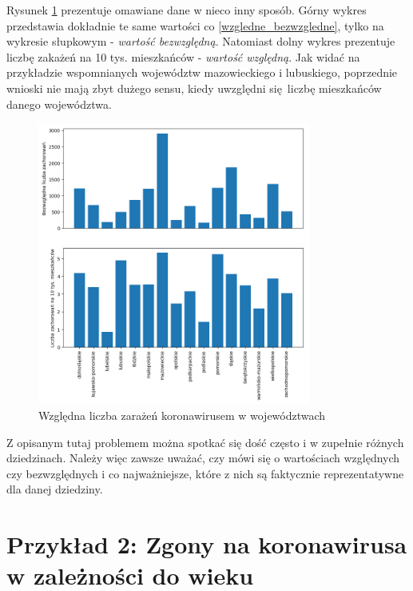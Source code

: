 \documentclass{classrep}
\begin{document}
Rysunek \ref{wzgledne_bezwzgledne_fixed} prezentuje omawiane dane w nieco inny sposób. Górny wykres
przedstawia dokładnie te same wartości co \ref{wzgledne_bezwzgledne}, tylko na wykresie słupkowym -
\emph{wartość bezwzględną}.  Natomiast dolny wykres prezentuje liczbę zakażeń na 10 tys.
mieszkańców - \emph{wartość względną}. Jak widać na przykładzie wspomnianych województw
mazowieckiego i lubuskiego, poprzednie wnioski nie mają zbyt dużego sensu, kiedy uwzględni
się liczbę mieszkańców danego województwa.

\begin{figure}
    \centering
    \includegraphics[width=0.8\textwidth,keepaspectratio]{img/wzgledne_bezwzgledne_fixed.png}
    \caption{Względna liczba zarażeń koronawirusem w województwach}
    \label{wzgledne_bezwzgledne_fixed}
\end{figure}

Z opisanym tutaj problemem można spotkać się dość często i w zupełnie różnych dziedzinach. Należy
więc zawsze uważać, czy mówi się o wartościach względnych czy bezwzględnych i co najważniejsze,
które z nich są faktycznie reprezentatywne dla danej dziedziny.

\section{Przykład 2: Zgony na koronawirusa w zależności do wieku}
\end{document}
